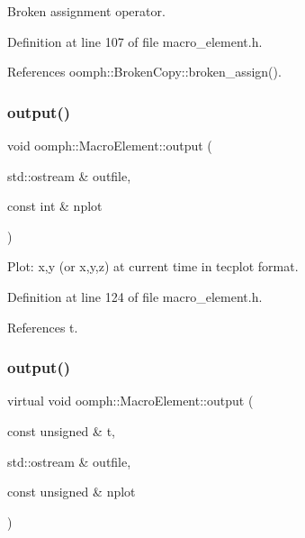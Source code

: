 Broken assignment operator. 



Definition at line 107 of file macro\+\_\+element.\+h.



References oomph\+::\+Broken\+Copy\+::broken\+\_\+assign().

\mbox{\label{classoomph_1_1MacroElement_a92030ed18caf4539c9e44e1062457edc}} 
\subsubsection{\texorpdfstring{output()}{output()}\hspace{0.1cm}{\footnotesize\ttfamily [1/2]}}
{\footnotesize\ttfamily void oomph\+::\+Macro\+Element\+::output (\begin{DoxyParamCaption}\item[{std\+::ostream \&}]{outfile,  }\item[{const int \&}]{nplot }\end{DoxyParamCaption})\hspace{0.3cm}{\ttfamily [inline]}}



Plot\+: x,y (or x,y,z) at current time in tecplot format. 



Definition at line 124 of file macro\+\_\+element.\+h.



References t.

\mbox{\label{classoomph_1_1MacroElement_a5d3646716d60aedf456889768a3c2dbe}} 
\subsubsection{\texorpdfstring{output()}{output()}\hspace{0.1cm}{\footnotesize\ttfamily [2/2]}}
{\footnotesize\ttfamily virtual void oomph\+::\+Macro\+Element\+::output (\begin{DoxyParamCaption}\item[{const unsigned \&}]{t,  }\item[{std\+::ostream \&}]{outfile,  }\item[{const unsigned \&}]{nplot }\end{DoxyParamCaption})\hspace{0.3cm}{\ttfamily [pure virtual]}}



